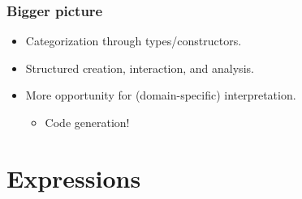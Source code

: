 \documentclass[xcolor={dvipsnames}]{beamer}
\begin{document}
\begin{frame}
  \frametitle{Bigger picture}

  \begin{itemize}
    \item Categorization through types/constructors.
    \item Structured creation, interaction, and analysis.
    \item More opportunity for (domain-specific) interpretation.
      \begin{itemize}
        \item Code generation!
      \end{itemize}
  \end{itemize}

\end{frame}

\section{Expressions}
\end{document}
